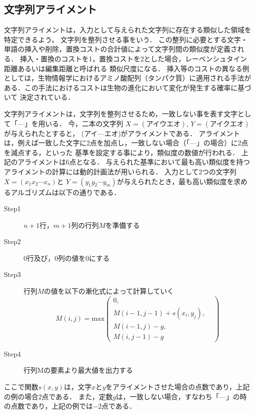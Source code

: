 \documentclass[japanese]{jnlp_1.4}
\begin{document}
\subsection{文字列アライメント}

文字列アライメントは，入力として与えられた文字列に存在する類似した領域を特定できるよう，
文字列を整列させる事をいう．
この整列に必要とする文字・単語の挿入や削除，置換コストの合計値によって文字列間の類似度が定義される．
挿入・置換のコストを1，置換コストを2とした場合，レーベンシュタイン距離あるいは編集距離と呼ばれる
類似尺度になる．
挿入等のコストの異なる例としては，生物情報学におけるアミノ酸配列（タンパク質）に適用される手法がある\cite{smithwaterman,needleman}．この手法におけるコストは生物の進化において変化が発生する確率に基づいて
決定されている．

文字列アライメントは，文字列を整列させるため，一致しない事を表す文字として「—」を用いる．
今，二本の文字列 $X=(\text{アイウエオ})$, $Y=(\text{アイクエオ})$ が与えられたとすると，
(アイ—エオ)がアライメントである．
アライメントは，例えば一致した文字に2点を加点し，一致しない場合（「—」の場合）に2点を減点する，といった
基準を設定する事により，類似度の数値が行われる．
上記のアライメントは6点となる．
与えられた基準において最も高い類似度を持つアライメントの計算には動的計画法が用いられる．
入力として2つの文字列$X=(x_1x_2\cdots x_n)$と
$Y=(y_1y_2\cdots y_m)$が与えられたとき，最も高い類似度を求めるアルゴリズムは以下の通りである．

\begin{description}
\item[Step1] $n+1$行，$m+1$列の行列$M$を準備する
\item[Step2] $0$行及び，$0$列の値を$0$にする

\item[Step3] 行列$M$の値を以下の漸化式によって計算していく
\[
M(i,j) = \text{max}
\begin{pmatrix}
0, &\\
M(i-1,j-1) +s(x_i,y_j),  &  \\
M(i-1,j)-g, &\\
M(i,j-1)-g& 
\end{pmatrix}
\]

\item[Step4] 行列Mの要素より最大値を出力する
\end{description}

ここで関数$s(x,y)$は，文字$x$と$y$をアライメントさせた場合の点数であり，上記の例の場合$2点$である．
また，定数$g$は，一致しない場合，すなわち「—」の時の点数であり，上記の例では$-2$点である．
\end{document}
